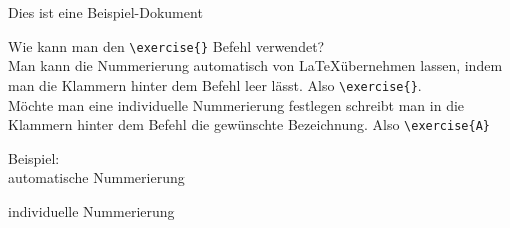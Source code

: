 \documentclass{uni_tue_template}
\begin{document}
Dies ist eine Beispiel-Dokument

Wie kann man den \verb+\exercise{}+ Befehl verwendet?\\
Man kann die Nummerierung automatisch von \LaTeX\hspace{1.5mm}übernehmen lassen, indem man die Klammern hinter dem Befehl leer lässt. Also \verb+\exercise{}+.\\
Möchte man eine individuelle Nummerierung festlegen schreibt man in die Klammern hinter dem Befehl die gewünschte Bezeichnung. Also \verb+\exercise{A}+

Beispiel:\\
\exercise{}
automatische Nummerierung

individuelle Nummerierung
\end{document}
